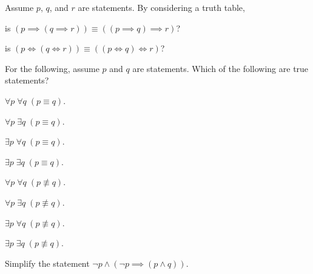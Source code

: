 \begin{problem}
    Assume $p$, $q$, and $r$ are statements. By considering a truth table,
    \begin{partquestions}{\alph*}
        \item is $(p \implies (q \implies r)) \equiv ((p \implies q) \implies r)$?
        \item is $(p \iff (q \iff r)) \equiv ((p \iff q) \iff r)$?
    \end{partquestions}
\end{problem}

\begin{problem}
    For the following, assume $p$ and $q$ are statements. Which of the following are true statements?
    \begin{multicols}{2}
        \begin{partquestions}{\alph*}
            \item $\forall p\; \forall q\; (p \equiv q)$.
            \item $\forall p\; \exists q\; (p \equiv q)$.
            \item $\exists p\; \forall q\; (p \equiv q)$.
            \item $\exists p\; \exists q\; (p \equiv q)$.
            \item $\forall p\; \forall q\; (p \not\equiv q)$.
            \item $\forall p\; \exists q\; (p \not\equiv q)$.
            \item $\exists p\; \forall q\; (p \not\equiv q)$.
            \item $\exists p\; \exists q\; (p \not\equiv q)$.
        \end{partquestions}
    \end{multicols}
\end{problem}

\begin{problem}
    Simplify the statement $\lnot p \land (\lnot p \implies (p \land q))$.
\end{problem}
